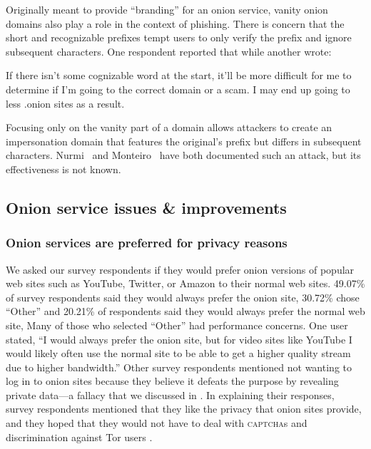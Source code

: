 Originally meant to provide ``branding'' for an onion service, vanity onion
domains also play a role in the context of phishing.  There is concern that the
short and recognizable prefixes tempt users to only verify the prefix and ignore
subsequent characters.  One respondent reported that   while another wrote:

\begin{displayquote}
If there isn't some cognizable word at the start, it'll be more difficult for me
to determine if I'm going to the correct domain or a scam. I may end up going to
less .onion sites as a result.
\end{displayquote}

Focusing only on the vanity part of a domain allows attackers to create an
impersonation domain that features the original's prefix but differs in
subsequent characters.  Nurmi~\cite{Nurmi2015a} and
Monteiro~\cite{Monteiro2016a} have both documented such an attack, but its
effectiveness is not known.


\subsection{Onion service issues \& improvements}
\label{sec:improve}

\subsubsection{Onion services are preferred for privacy reasons}
We asked our survey respondents if they would prefer onion versions of popular web sites such as
YouTube, Twitter, or Amazon to their normal web
sites. 49.07\% of survey respondents said they
would always prefer the onion site, 30.72\% chose ``Other'' and 20.21\% of
respondents said they would always prefer the normal web site,  Many of those
who selected ``Other'' had performance concerns.   One user stated, ``I would
always prefer the onion site, but for video sites like YouTube I would likely
often use the normal site to be able to get a higher quality stream due to
higher bandwidth.'' Other survey respondents mentioned not wanting to log in to onion sites
because they believe it defeats the purpose by revealing private data---a fallacy that we discussed in
.  In explaining their responses, survey respondents mentioned
that they like the privacy that onion sites provide, and they hoped that they
would not have to deal with \textsc{captcha}s and discrimination against Tor
users .


